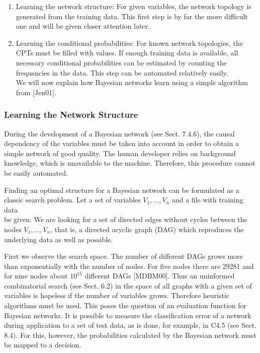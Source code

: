 \documentclass[10pt]{article}
\begin{document}
\begin{enumerate}
  \item Learning the network structure: For given variables, the network topology is generated from the training data. This first step is by far the more difficult one and will be given closer attention later.
  \item Learning the conditional probabilities: For known network topologies, the CPTs must be filled with values. If enough training data is available, all necessary conditional probabilities can be estimated by counting the frequencies in the data. This step can be automated relatively easily.\\[0pt]
We will now explain how Bayesian networks learn using a simple algorithm from [Jen01].
\end{enumerate}

\subsubsection*{Learning the Network Structure}
During the development of a Bayesian network (see Sect. 7.4.6), the causal dependency of the variables must be taken into account in order to obtain a simple network of good quality. The human developer relies on background knowledge, which is unavailable to the machine. Therefore, this procedure cannot be easily automated.

Finding an optimal structure for a Bayesian network can be formulated as a classic search problem. Let a set of variables $V_{1}, \ldots, V_{n}$ and a file with training data\\
be given. We are looking for a set of directed edges without cycles between the nodes $V_{1}, \ldots, V_{n}$, that is, a directed acyclic graph (DAG) which reproduces the underlying data as well as possible.

First we observe the search space. The number of different DAGs grows more than exponentially with the number of nodes. For five nodes there are 29281 and for nine nodes about $10^{15}$ different DAGs [MDBM00]. Thus an uninformed combinatorial search (see Sect. 6.2) in the space of all graphs with a given set of variables is hopeless if the number of variables grows. Therefore heuristic algorithms must be used. This poses the question of an evaluation function for Bayesian networks. It is possible to measure the classification error of a network during application to a set of test data, as is done, for example, in C4.5 (see Sect. 8.4). For this, however, the probabilities calculated by the Bayesian network must be mapped to a decision.
\end{document}
